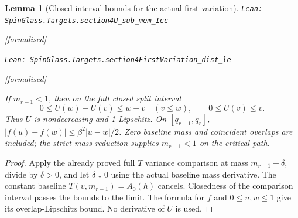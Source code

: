 \documentclass[11pt]{article}
\providecommand{\lean}[1]{\leavevmode\par\nopagebreak
  {\noindent\normalfont\footnotesize\raggedright\texttt{Lean: #1}\par}\nopagebreak}
\providecommand{\leanok}{\par\nopagebreak
  {\noindent\normalfont\footnotesize\textcolor{green!50!black}{[formalised]}\par}\nopagebreak}
\newtheorem{lemma}[theorem]{Lemma}
\begin{document}
\begin{lemma}[Closed-interval bounds for the actual first variation]
\lean{SpinGlass.Targets.section4U\_sub\_mem\_Icc}\leanok
\lean{SpinGlass.Targets.section4FirstVariation\_dist\_le}\leanok
If $m_{r-1}<1$, then on the full closed split interval
\[
 0\le U(w)-U(v)\le w-v\quad(v\le w),\qquad 0\le U(v)\le v.
\]
Thus $U$ is nondecreasing and 1-Lipschitz. On $[q_{r-1},q_r]$,
$|f(u)-f(w)|\le \beta^2|u-w|/2$. Zero baseline mass and coincident overlaps
are included; the strict-mass reduction supplies $m_{r-1}<1$ on the critical path.
\end{lemma}
\begin{proof}
Apply the already proved full $T$ variance comparison at mass $m_{r-1}+\delta$,
divide by $\delta>0$, and let $\delta\downarrow0$ using the actual baseline
mass derivative. The constant baseline $T(v,m_{r-1})=A_0(h)$ cancels.
Closedness of the comparison interval passes the bounds to the limit.
The formula for $f$ and $0\le u,w\le1$ give its overlap-Lipschitz bound.
No derivative of $U$ is used.
\end{proof}
\end{document}
